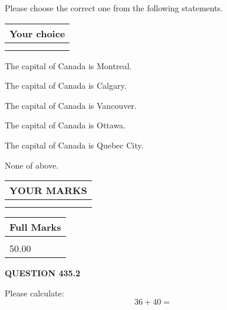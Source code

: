 \documentclass[12pt]{article}
\begin{document}
  
Please choose the correct one from the following statements.
  
  
\noindent\hspace{3.0in} \begin{tabular}{|l|}
\hline
Your choice \\
\hline
 \\ 
 \\ 
\hline
\end{tabular}
  
  
 
 
The capital of Canada is Montreal.
 
 
The capital of Canada is Calgary.
 
 
The capital of Canada is Vancouver.
 
 
The capital of Canada is Ottawa.
 
 
The capital of Canada is Quebec City.
 
 
 None of above.
 
 
  
\vspace{0.2in}
  
\noindent\begin{tabular}{|l|}
\hline
 YOUR MARKS  \\
\hline
 \\ 
 \\ 
\hline
\end{tabular}
\hspace{0.05in} \begin{tabular}{|l|}
\hline
 Full Marks  \\
\hline
 \\ 
50.00 \\
\hline
\end{tabular}
{\textbf{\Large{QUESTION
435.2 
}}}
  
  
 
Please calculate:
\begin{equation}
36 +  %
40 = \nonumber
\end{equation}
 

 

 
   
   
 \vspace{0.2in}
 
   
   
   
   
\end{document}
